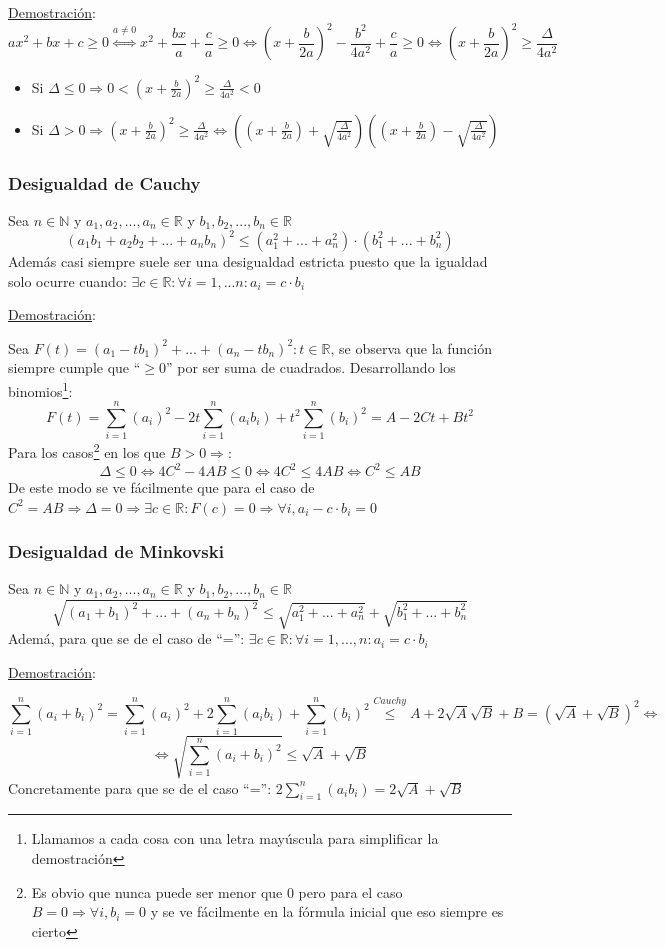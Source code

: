 \documentclass[10pt,a4paper,openright]{book}
\theoremstyle{break}
\begin{document}
\underline{Demostración}:
$$ax^2+bx+c\geq 0\stackrel{a\neq 0}{\Leftrightarrow} x^2+\frac{bx}{a}+\frac{c}{a}\geq 0\Leftrightarrow (x+\frac{b}{2a})^2-\frac{b^2}{4a^2}+\frac{c}{a}\geq 0\Leftrightarrow (x+\frac{b}{2a})^2\geq \frac{\Delta}{4a^2}$$
\begin{itemize}
\item Si $\Delta\leq 0\Rightarrow 0<(x+\frac{b}{2a})^2 \geq \frac{\Delta}{4a^2}<0$
\item Si $\Delta>0\Rightarrow (x+\frac{b}{2a})^2 \geq \frac{\Delta}{4a^2}\Leftrightarrow \left((x+\frac{b}{2a})+\sqrt{\frac{\Delta}{4a^2}}\right)\left((x+\frac{b}{2a})-\sqrt{\frac{\Delta}{4a^2}}\right)$
\end{itemize}

\subsubsection{Desigualdad de Cauchy}
Sea $n\in \mathbb N$ y $a_1, a_2, ..., a_n\in \mathbb R$ y $b_1, b_2, ..., b_n\in \mathbb R$
$$(a_1b_1+a_2b_2+...+a_nb_n)^2 \leq (a_1^2+...+a_n^2)\cdot (b_1^2+...+b_n^2)$$
Además casi siempre suele ser una desigualdad estricta puesto que la igualdad solo ocurre cuando: $\exists c\in \mathbb R : \forall i=1,...n :a_i=c\cdot b_i$\par
\underline{Demostración}:\par
Sea $F(t)=(a_1-tb_1)^2+...+(a_n-tb_n)^2 : t\in \mathbb R$, se observa que la función siempre cumple que ``$\geq 0$'' por ser suma de cuadrados. Desarrollando los binomios\footnote{Llamamos a cada cosa con una letra mayúscula para simplificar la demostración}:
$$F(t)=\sum_{i=1}^n (a_i)^2 -2t\sum_{i=1}^n (a_ib_i) + t^2\sum_{i=1}^n (b_i)^2=A-2Ct+Bt^2$$
Para los casos\footnote{Es obvio que nunca puede ser menor que 0 pero para el caso $B=0\Rightarrow \forall i, b_i=0$ y se ve fácilmente en la fórmula inicial que eso siempre es cierto} en los que $B>0\Rightarrow$:
$$\Delta\leq 0\Leftrightarrow 4C^2-4AB\leq 0\Leftrightarrow 4C^2\leq 4AB\Leftrightarrow C^2\leq AB$$
De este modo se ve fácilmente que para el caso de $C^2=AB\Rightarrow \Delta=0\Rightarrow \exists c\in \mathbb R : F(c)=0\Rightarrow \forall  i, a_i-c\cdot b_i=0$

\subsubsection{Desigualdad de Minkovski}
Sea $n\in \mathbb N$ y $a_1, a_2, ..., a_n\in \mathbb R$ y $b_1, b_2, ..., b_n\in \mathbb R$
$$\sqrt{(a_1+b_1)^2+...+(a_n+b_n)^2}\leq \sqrt{a_1^2+...+a_n^2}+\sqrt{b_1^2+...+b_n^2}$$
Ademá, para que se de el caso de ``='': $\exists c\in \mathbb R : \forall i=1,...,n : a_i=c\cdot b_i$\par
\underline{Demostración}:\par
$$\sum_{i=1}^n (a_i+b_i)^2=\sum_{i=1}^n (a_i)^2+2\sum_{i=1}^n (a_ib_i)+ \sum_{i=1}^n (b_i)^2\stackrel{Cauchy}{\leq}A+2\sqrt{A}\sqrt{B}+B=(\sqrt{A}+\sqrt{B})^2\Leftrightarrow$$
$$\Leftrightarrow \sqrt{\sum_{i=1}^n (a_i+b_i)^2}\leq \sqrt{A}+\sqrt{B}$$
Concretamente para que se de el caso ``='': $2\sum_{i=1}^n (a_ib_i)=2\sqrt{A}+\sqrt{B}$
\end{document}
